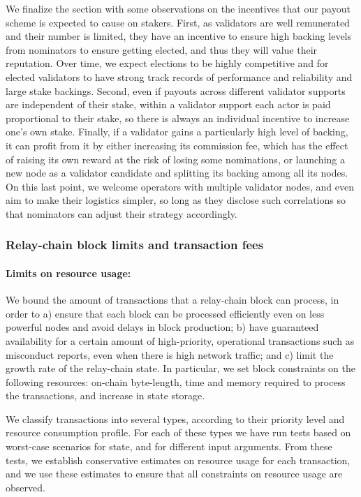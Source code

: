 We finalize the section with some observations on the incentives that our payout scheme is expected to cause on stakers. 
First, as validators are well remunerated and their number is limited, 
they have an incentive to ensure high backing levels from nominators to ensure getting elected, 
and thus they will value their reputation. Over time, we expect elections to be highly competitive 
and for elected validators to have strong track records of performance and reliability and large stake backings.
Second, even if payouts across different validator supports are independent of their stake, 
within a validator support each actor is paid proportional to their stake, 
so there is always an individual incentive to increase one's own stake. 
Finally, if a validator gains a particularly high level of backing, it can profit from it by either increasing 
its commission fee, which has the effect of raising its own reward at the risk of losing some nominations, 
or launching a new node as a validator candidate and splitting its backing among all its nodes. 
On this last point, we welcome operators with multiple validator nodes, 
and even aim to make their logistics simpler, so long as they disclose such correlations 
so that nominators can adjust their strategy accordingly.


\subsubsection{Relay-chain block limits and transaction fees}

\paragraph{Limits on resource usage:} We bound the amount of transactions that a relay-chain block can process, 
in order to a) ensure that each block can be processed efficiently even on less powerful nodes and avoid delays in block production; b) have guaranteed availability for a certain amount of high-priority, operational transactions such as misconduct reports, even when there is high network traffic; and c) limit the growth rate of the relay-chain state. 
In particular, we set block constraints on the following resources: on-chain byte-length, 
time and memory required to process the transactions, and increase in state storage.

We classify transactions into several types, according to their priority level and resource consumption profile. 
For each of these types we have run tests based on worst-case scenarios for state, and for different input arguments. 
From these tests, we establish conservative estimates on resource usage for each transaction, and we use these estimates to ensure that all constraints on resource usage are observed.

